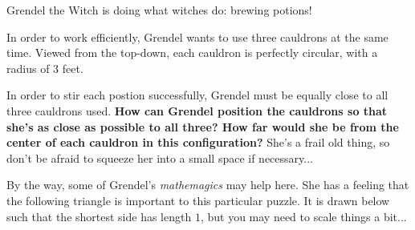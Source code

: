 


Grendel the Witch is doing what witches do: brewing potions!

In order to work efficiently, Grendel wants to use three cauldrons at
the same time. Viewed from the top-down, each cauldron is perfectly
circular, with a radius of \(3\) feet.

\begin{center}
\end{center}

In order to stir each postion successfully, Grendel must be equally close
to all three cauldrons used.
\textbf{How can Grendel position the cauldrons so that she's as close as
possible to all three? How far would she be from the center of
each cauldron in this configuration?} She's a frail old thing, so don't
be afraid to squeeze her into a small space if necessary...

By the way,
some of Grendel's \textit{mathemagics} may help here. She has a feeling
that the following triangle is important to this particular puzzle.
It is drawn below such that the shortest side has length \(1\), but you
may need to scale things a bit...


\begin{center}
\end{center}
